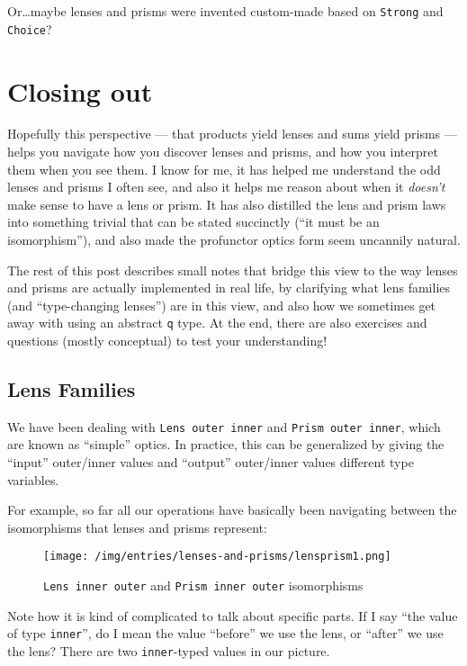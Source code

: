 \documentclass[]{article}
\begin{document}
Or\ldots{}maybe lenses and prisms were invented custom-made based on
\texttt{Strong} and \texttt{Choice}?

\hypertarget{closing-out}{%
\section{Closing out}\label{closing-out}}

Hopefully this perspective --- that products yield lenses and sums yield prisms
--- helps you navigate how you discover lenses and prisms, and how you interpret
them when you see them. I know for me, it has helped me understand the odd
lenses and prisms I often see, and also it helps me reason about when it
\emph{doesn't} make sense to have a lens or prism. It has also distilled the
lens and prism laws into something trivial that can be stated succinctly (``it
must be an isomorphism''), and also made the profunctor optics form seem
uncannily natural.

The rest of this post describes small notes that bridge this view to the way
lenses and prisms are actually implemented in real life, by clarifying what lens
families (and ``type-changing lenses'') are in this view, and also how we
sometimes get away with using an abstract \texttt{q} type. At the end, there are
also exercises and questions (mostly conceptual) to test your understanding!

\hypertarget{lens-families}{%
\subsection{Lens Families}\label{lens-families}}

We have been dealing with \texttt{Lens\textquotesingle{}\ outer\ inner} and
\texttt{Prism\textquotesingle{}\ outer\ inner}, which are known as ``simple''
optics. In practice, this can be generalized by giving the ``input'' outer/inner
values and ``output'' outer/inner values different type variables.

For example, so far all our operations have basically been navigating between
the isomorphisms that lenses and prisms represent:

\begin{figure}
\centering
\texttt{[image: /img/entries/lenses-and-prisms/lensprism1.png]}
\caption{\texttt{Lens\textquotesingle{}\ inner\ outer} and
\texttt{Prism\textquotesingle{}\ inner\ outer} isomorphisms}
\end{figure}

Note how it is kind of complicated to talk about specific parts. If I say ``the
value of type \texttt{inner}'', do I mean the value ``before'' we use the lens,
or ``after'' we use the lens? There are two \texttt{inner}-typed values in our
picture.
\end{document}
